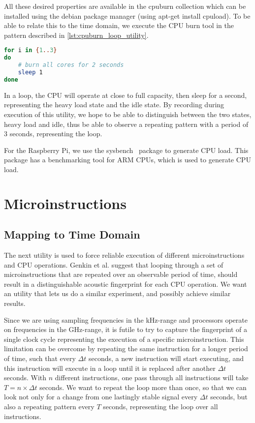 All these desired properties are available in the cpuburn collection which can be installed using the debian package manager (using
apt-get install cpuload). 
To be able to relate this to the time domain, we execute the \gls{CPU} burn tool in the pattern described in \autoref{lst:cpuburn_loop_utility}.

\begin{lstlisting}[language=BASH, caption={Mapping execution to the time domain: CPU Burn Utility}, label={lst:cpuburn_loop_utility}]
for i in {1..3}
do
	# burn all cores for 2 seconds
	sleep 1
done
\end{lstlisting}

In a loop, the \gls{CPU} will operate at close to full capacity, then sleep for a second, representing the heavy load state and the idle state.
By recording during execution of this utility, we hope to be able to distinguish between the two states, heavy load and idle, thus be able to observe a repeating pattern with a period of \(3\) seconds, representing the loop.

For the Raspberry Pi, we use the sysbench~\cite{url:sysbench_wiki} package to generate CPU load. 
This package has a benchmarking tool for ARM \gls{CPU}s, which is used to generate \gls{CPU} load.

\section{Microinstructions}\label{chp4:sec:microinstructions}


\subsection{Mapping to Time Domain}\label{chp4:sec:mapping_to_time_domain}
The next utility is used to force reliable execution of different microinstructions and \gls{CPU} operations.
Genkin et al. suggest that looping through a set of microinstructions that are repeated over an observable period of time, should result in a distinguishable acoustic fingerprint for each \gls{CPU} operation.
We want an utility that lets us do a similar experiment, and possibly achieve similar results.

Since we are using sampling frequencies in the kHz-range and processors operate on frequencies in the GHz-range, it is futile to try to capture the fingerprint of a single clock cycle representing the execution of a specific microinstruction. 
This limitation can be overcome by repeating the same instruction for a longer period of time, such that every \(\Delta t\) seconds, a new instruction will start executing, and this instruction will execute in a loop until it is replaced after another \(\Delta t\) seconds.
With \(n\) different instructions, one pass through all instructions will take \(T = n \times \Delta t\) seconds.
We want to repeat the loop more than once, so that we can look not only for a change from one lastingly stable signal every \(\Delta t\) seconds, but also a repeating pattern every \(T\) seconds, representing the loop over all instructions.

